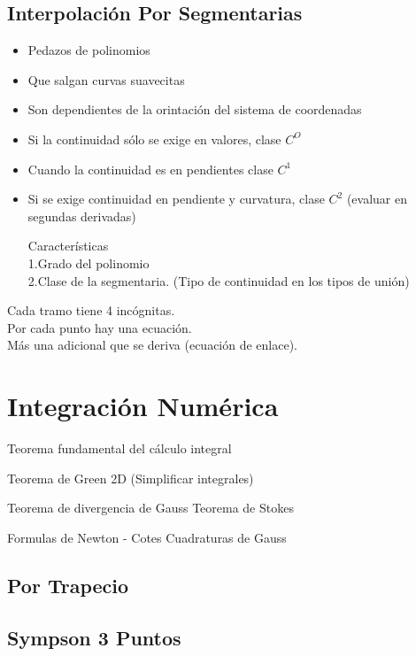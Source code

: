 \subsection{Interpolaci\'on Por Segmentarias}
\begin{itemize}
\item Pedazos de polinomios
\item Que salgan curvas suavecitas
\item Son dependientes de la orintaci\'on del sistema de coordenadas

\item Si la continuidad s\'olo se exige en valores, clase $C^O$
\item Cuando la continuidad es en pendientes clase $C^1$

\item Si se exige continuidad en pendiente y curvatura, clase $C^2$ (evaluar en segundas derivadas)

Caracter\'isticas\\
1.Grado del polinomio\\
2.Clase de la segmentaria. (Tipo de continuidad en los tipos de uni\'on)
\end{itemize}

Cada tramo tiene 4 inc\'ognitas.\\
Por cada punto hay una ecuaci\'on.\\
M\'as una adicional que se deriva (ecuaci\'on de enlace).

\section{Integraci\'on Num\'erica}

Teorema fundamental del c\'alculo integral

Teorema de Green 2D (Simplificar integrales)

Teorema de divergencia de Gauss
Teorema de Stokes


Formulas de Newton - Cotes
Cuadraturas de Gauss

\subsection{Por Trapecio}

\subsection{Sympson 3 Puntos}

